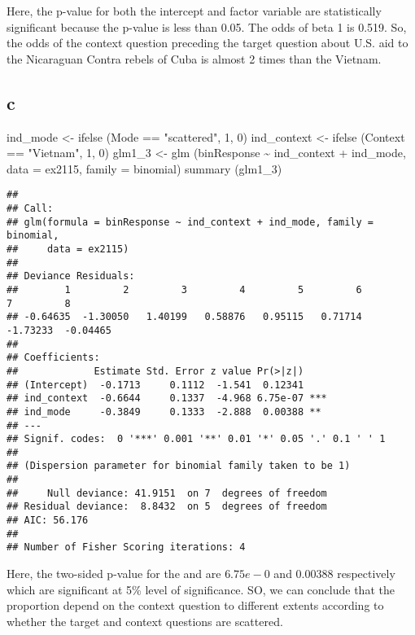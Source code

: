 \documentclass[
]{article}
\newenvironment{Shaded}{\begin{snugshade}}{\end{snugshade}}
\newcommand{\AttributeTok}[1]{\textcolor[rgb]{0.77,0.63,0.00}{#1}}
\newcommand{\DecValTok}[1]{\textcolor[rgb]{0.00,0.00,0.81}{#1}}
\newcommand{\FunctionTok}[1]{\textcolor[rgb]{0.00,0.00,0.00}{#1}}
\newcommand{\NormalTok}[1]{#1}
\newcommand{\OtherTok}[1]{\textcolor[rgb]{0.56,0.35,0.01}{#1}}
\newcommand{\SpecialCharTok}[1]{\textcolor[rgb]{0.00,0.00,0.00}{#1}}
\newcommand{\StringTok}[1]{\textcolor[rgb]{0.31,0.60,0.02}{#1}}
\begin{document}
Here, the p-value for both the intercept and factor variable are
statistically significant because the p-value is less than 0.05. The
odds of beta 1 is 0.519. So, the odds of the context question preceding
the target question about U.S. aid to the Nicaraguan Contra rebels of
Cuba is almost 2 times than the Vietnam.

\hypertarget{c}{%
\subsection{c}\label{c}}

\begin{Shaded}
\begin{Highlighting}[]
\NormalTok{ind\_mode }\OtherTok{\textless{}{-}} \FunctionTok{ifelse}\NormalTok{ (Mode }\SpecialCharTok{==} \StringTok{"scattered"}\NormalTok{, }\DecValTok{1}\NormalTok{, }\DecValTok{0}\NormalTok{)}
\NormalTok{ind\_context }\OtherTok{\textless{}{-}} \FunctionTok{ifelse}\NormalTok{ (Context }\SpecialCharTok{==} \StringTok{"Vietnam"}\NormalTok{, }\DecValTok{1}\NormalTok{, }\DecValTok{0}\NormalTok{)}
\NormalTok{glm1\_3 }\OtherTok{\textless{}{-}} \FunctionTok{glm}\NormalTok{ (binResponse }\SpecialCharTok{\textasciitilde{}}\NormalTok{ ind\_context }\SpecialCharTok{+}\NormalTok{ ind\_mode, }\AttributeTok{data =}\NormalTok{ ex2115, }\AttributeTok{family =}\NormalTok{ binomial)}
\FunctionTok{summary}\NormalTok{ (glm1\_3)}
\end{Highlighting}
\end{Shaded}

\begin{verbatim}
## 
## Call:
## glm(formula = binResponse ~ ind_context + ind_mode, family = binomial, 
##     data = ex2115)
## 
## Deviance Residuals: 
##        1         2         3         4         5         6         7         8  
## -0.64635  -1.30050   1.40199   0.58876   0.95115   0.71714  -1.73233  -0.04465  
## 
## Coefficients:
##             Estimate Std. Error z value Pr(>|z|)    
## (Intercept)  -0.1713     0.1112  -1.541  0.12341    
## ind_context  -0.6644     0.1337  -4.968 6.75e-07 ***
## ind_mode     -0.3849     0.1333  -2.888  0.00388 ** 
## ---
## Signif. codes:  0 '***' 0.001 '**' 0.01 '*' 0.05 '.' 0.1 ' ' 1
## 
## (Dispersion parameter for binomial family taken to be 1)
## 
##     Null deviance: 41.9151  on 7  degrees of freedom
## Residual deviance:  8.8432  on 5  degrees of freedom
## AIC: 56.176
## 
## Number of Fisher Scoring iterations: 4
\end{verbatim}

Here, the two-sided p-value for the  and  are \(6.75e-0\) and
\(0.00388\) respectively which are significant at 5\% level of
significance. SO, we can conclude that the proportion depend on the
context question to different extents according to whether the target
and context questions are scattered.
\end{document}
